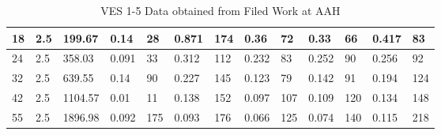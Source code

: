 \documentclass[12pt,a4paper]{report}
\begin{document}
\begin{itemize}
\begin{table}[H]
\begin{adjustbox}{max width=\textwidth}
\begin{tabular}{|p{2.5cm}|p{2.5cm}|p{2.5cm}|p{1.5cm}|p{1.8cm}|p{1.5cm}|p{1.8cm}|p{1.5cm}|p{1.8cm}|p{1.5cm}|p{1.8cm}|p{1.5cm}|p{1.8cm}|}
        18 & 2.5 & 199.67 & 0.14 & 28 & 0.871 & 174 & 0.36 & 72 & 0.33 & 66 & 0.417 & 83 \\ \hline
        24 & 2.5 & 358.03 & 0.091 & 33 & 0.312 & 112 & 0.232 & 83 & 0.252 & 90 & 0.256 & 92 \\ \hline
        32 & 2.5 & 639.55 & 0.14 & 90 & 0.227 & 145 & 0.123 & 79 & 0.142 & 91 & 0.194 & 124 \\ \hline
        42 & 2.5 & 1104.57 & 0.01 & 11 & 0.138 & 152 & 0.097 & 107 & 0.109 & 120 & 0.134 & 148 \\ \hline
        55 & 2.5 & 1896.98 & 0.092 & 175 & 0.093 & 176 & 0.066 & 125 & 0.074 & 140 & 0.115 & 218 \\ \hline
        \end{tabular}
        \end{adjustbox}
        \caption{VES 1-5 Data obtained from Filed Work at AAH}
        \label{tab:aah_ves-1-5}
    \end{table}


\end{itemize}
\end{document}
